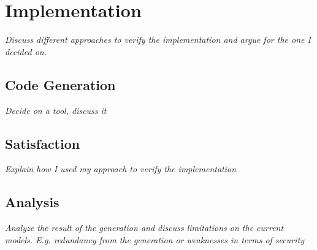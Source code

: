 \chapter{Implementation}




\textit{Discuss different approaches to verify the implementation and argue for the one I decided on.}

\section{Code Generation}

\textit{Decide on a tool, discuss it}

\section{Satisfaction}

\textit{Explain how I used my approach to verify the implementation}

\section{Analysis}

\textit{Analyze the result of the generation and discuss limitations on the current models. E.g. redundancy from the generation or weaknesses in terms of security}


